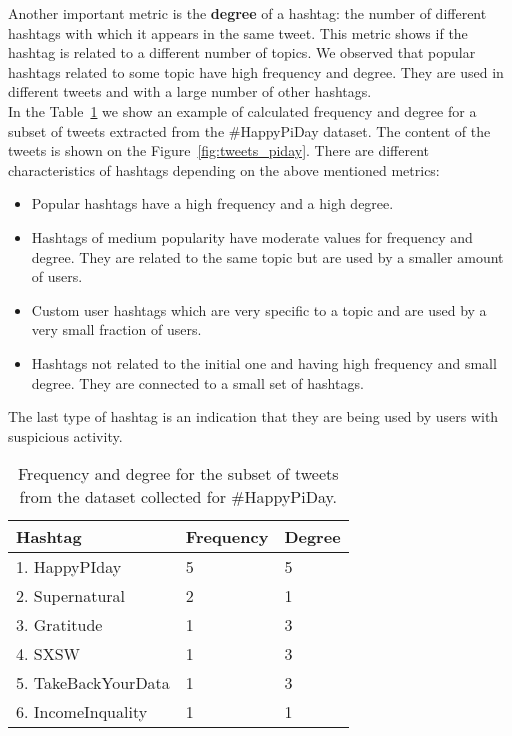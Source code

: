 \documentclass[journal, a4paper, 12pt]{article}
\begin{document}
Another important metric is the \textbf{degree} of a hashtag: the number of different hashtags with which it appears in the same tweet. This metric shows if the hashtag is related to a different number of topics. We observed that popular hashtags related to some topic have high frequency and degree. They are used in different tweets and with a large number of other hashtags. \\

In the Table~\ref{tab:graph_freq_degree} we show an example of calculated frequency and degree for a subset of tweets extracted from the \#HappyPiDay dataset. The content of the tweets is shown on the Figure~\ref{fig:tweets_piday}. There are different characteristics of hashtags depending on the above mentioned metrics:

\begin{itemize}

\item Popular hashtags have a high frequency and a high degree.

\item Hashtags of medium popularity have moderate values for frequency and degree. They are related to the same topic but are used by a smaller amount of users.

\item Custom user hashtags which are very specific to a topic and are used by a very small fraction of users.

\item Hashtags not related to the initial one and having high frequency and small degree. They are connected to a small set of hashtags.
\end{itemize}

The last type of hashtag is an indication that they are being used by users with suspicious activity. \\

      \begin{table}[!hbt]
		\begin{center}
		\caption{Frequency and degree for the subset of tweets from the dataset collected for \#HappyPiDay.}
		\label{tab:graph_freq_degree}
		\begin{tabular}{|p{4cm}|p{2cm}|p{2cm}|}
			\hline
			Hashtag & Frequency & Degree \\
            \hline
			1. HappyPIday & 5 & 5 \\
			\hline
			2. Supernatural & 2  &  1  \\
			\hline
			3. Gratitude & 1 & 3 \\
            \hline
            4. SXSW & 1 & 3 \\
			\hline
            5. TakeBackYourData & 1 & 3\\
			\hline
            6. IncomeInquality & 1 & 1 \\
			\hline
		\end{tabular}
		\end{center}
	\end{table}
\end{document}
